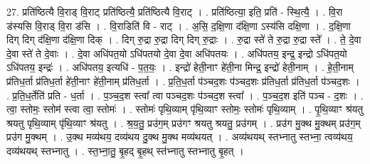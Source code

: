 \documentclass[17pt]{extarticle}
\begin{document}
27. प्रति॑ष्ठित्यै वि॒राड् वि॒राट् प्रति॑ष्ठित्यै॒ प्रति॑ष्ठित्यै वि॒राट् । . प्रति॑ष्ठित्या॒ इति॒ प्रति॑ - स्थि॒त्यै॒ । . वि॒रा ड॑स्यसि वि॒राड् वि॒रा ड॑सि । . वि॒राडिति॑ वि - राट् । . अ॒सि॒ द॒क्षि॒णा द॑क्षि॒णा ऽस्य॑सि दक्षि॒णा । . द॒क्षि॒णा दिग् दिग् द॑क्षि॒णा द॑क्षि॒णा दिक् । . दिग् रु॒द्रा रु॒द्रा दिग् दिग् रु॒द्राः । . रु॒द्रा स्ते॑ ते रु॒द्रा रु॒द्रा स्ते᳚ । . ते॒ दे॒वा दे॒वा स्ते॑ ते दे॒वाः । . दे॒वा अधि॑पत॒यो ऽधि॑पतयो दे॒वा दे॒वा अधि॑पतयः । . अधि॑पतय॒ इन्द्र॒ इन्द्रो ऽधि॑पत॒यो ऽधि॑पतय॒ इन्द्रः॑ । . अधि॑पतय॒ इत्यधि॑ - प॒त॒यः॒ । . इन्द्रो॑ हेती॒नाꣳ हे॑ती॒ना मिन्द्र॒ इन्द्रो॑ हेती॒नाम् । . हे॒ती॒नाम् प्र॑तिध॒र्ता प्र॑तिध॒र्ता हे॑ती॒नाꣳ हे॑ती॒नाम् प्र॑तिध॒र्ता । . प्र॒ति॒ध॒र्ता प॑ञ्चद॒शः प॑ञ्चद॒शः प्र॑तिध॒र्ता प्र॑तिध॒र्ता प॑ञ्चद॒शः । . प्र॒ति॒ध॒र्तेति॑ प्रति - ध॒र्ता । . प॒ञ्च॒द॒श स्त्वा᳚ त्वा पञ्चद॒शः प॑ञ्चद॒श स्त्वा᳚ । . प॒ञ्च॒द॒श इति॑ पञ्च - द॒शः । . त्वा॒ स्तोमः॒ स्तोम॑ स्त्वा त्वा॒ स्तोमः॑ । . स्तोमः॑ पृथि॒व्याम् पृ॑थि॒व्याꣳ स्तोमः॒ स्तोमः॑ पृथि॒व्याम् । . पृ॒थि॒व्याꣳ श्र॑यतु श्रयतु पृथि॒व्याम् पृ॑थि॒व्याꣳ श्र॑यतु । . श्र॒य॒तु॒ प्र‌उ॑ग॒म् प्र‌उ॑गꣳ श्रयतु श्रयतु॒ प्र‌उ॑गम् । . प्र‌उ॑ग मु॒क्थ मु॒क्थम् प्र‌उ॑ग॒म् प्र‌उ॑ग मु॒क्थम् । . उ॒क्थ मव्य॑थय॒ दव्य॑थय दु॒क्थ मु॒क्थ मव्य॑थयत् । . अव्य॑थयथ् स्तभ्नातु स्तभ्ना॒ त्वव्य॑थय॒ दव्य॑थयथ् स्तभ्नातु । . स्त॒भ्ना॒तु॒ बृ॒हद् बृ॒हथ् स्त॑भ्नातु स्तभ्नातु बृ॒हत् । \newline
\end{document}
